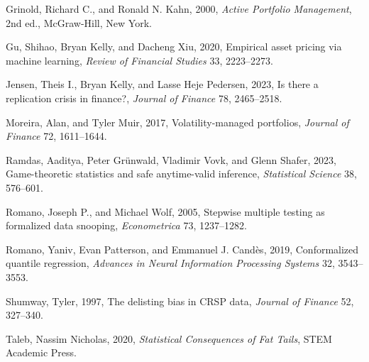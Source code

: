 \documentclass[10pt,twocolumn,letterpaper]{article}
\begin{document}
\begin{list}{}{\setlength{\leftmargin}{1.3em}\setlength{\itemindent}{-1.3em}\setlength{\itemsep}{1.0pt}\setlength{\parsep}{0pt}}
\item Grinold, Richard C., and Ronald N. Kahn, 2000, \textit{Active Portfolio Management}, 2nd ed., McGraw-Hill, New York.
\item Gu, Shihao, Bryan Kelly, and Dacheng Xiu, 2020, Empirical asset pricing via machine learning, \textit{Review of Financial Studies} 33, 2223--2273.
\item Jensen, Theis I., Bryan Kelly, and Lasse Heje Pedersen, 2023, Is there a replication crisis in finance?, \textit{Journal of Finance} 78, 2465--2518.
\item Moreira, Alan, and Tyler Muir, 2017, Volatility-managed portfolios, \textit{Journal of Finance} 72, 1611--1644.
\item Ramdas, Aaditya, Peter Gr\"unwald, Vladimir Vovk, and Glenn Shafer, 2023, Game-theoretic statistics and safe anytime-valid inference, \textit{Statistical Science} 38, 576--601.
\item Romano, Joseph P., and Michael Wolf, 2005, Stepwise multiple testing as formalized data snooping, \textit{Econometrica} 73, 1237--1282.
\item Romano, Yaniv, Evan Patterson, and Emmanuel J. Cand\`es, 2019, Conformalized quantile regression, \textit{Advances in Neural Information Processing Systems} 32, 3543--3553.
\item Shumway, Tyler, 1997, The delisting bias in CRSP data, \textit{Journal of Finance} 52, 327--340.
\item Taleb, Nassim Nicholas, 2020, \textit{Statistical Consequences of Fat Tails}, STEM Academic Press.
\end{list}
\end{document}
